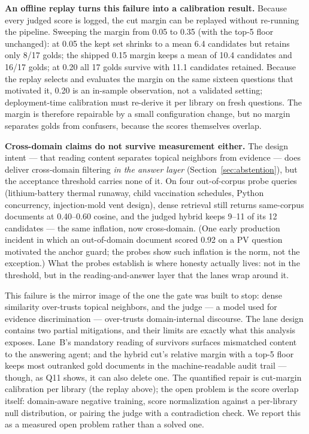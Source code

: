 \textbf{An offline replay turns this failure into a calibration result.}
Because every judged score is logged, the cut margin can be replayed
without re-running the pipeline. Sweeping the margin from 0.05 to 0.35
(with the top-5 floor unchanged): at 0.05 the kept set shrinks to a mean
6.4 candidates but retains only 8/17 golds; the shipped 0.15 margin keeps
a mean of 10.4 candidates and 16/17 golds; at 0.20 all 17 golds survive
with 11.1 candidates retained. Because the replay selects and evaluates
the margin on the same sixteen questions that motivated it, 0.20 is an
in-sample observation, not a validated setting; deployment-time
calibration must re-derive it per library on fresh questions. The margin
is therefore repairable by a
small configuration change, but no margin separates golds from
confusers, because the scores themselves overlap.

\textbf{Cross-domain claims do not survive measurement either.} The
design intent --- that reading content separates topical neighbors from
evidence --- does deliver cross-domain filtering \emph{in the answer
layer} (Section~\ref{sec:abstention}), but the acceptance threshold
carries none of it. On four
out-of-corpus probe queries (lithium-battery thermal runaway, child
vaccination schedules, Python concurrency, injection-mold vent design),
dense retrieval still returns same-corpus documents at 0.40--0.60 cosine,
and the judged hybrid keeps 9--11 of its 12 candidates --- the same
inflation, now cross-domain. (One early production incident in which an
out-of-domain document scored 0.92 on a PV question motivated the anchor
guard; the probes show such inflation is the norm, not the exception.)
What the probes establish is where honesty actually lives: not in the
threshold, but in the reading-and-answer layer that the lanes wrap around
it.

This failure is the mirror image of the one the gate was built to stop:
dense similarity over-trusts topical neighbors, and the judge --- a model
used for evidence discrimination --- over-trusts domain-internal
discourse. The lane design contains two partial mitigations, and their
limits are exactly what this analysis exposes. Lane~B's mandatory reading
of survivors surfaces mismatched content to the answering agent; and the
hybrid cut's relative margin with a top-5 floor keeps most outranked gold
documents in the machine-readable audit trail --- though, as Q11 shows,
it can also delete one. The quantified repair is cut-margin calibration
per library (the replay above); the open problem is the score overlap
itself: domain-aware negative training, score normalization against a
per-library null distribution, or pairing the judge with a contradiction
check. We report this as a measured open problem rather than a solved
one.

